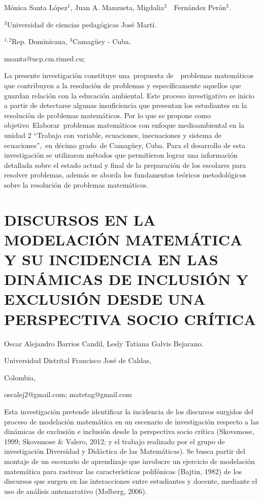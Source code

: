 \begin{datos}

Mónica Santa López$^{1}$, Juan A. Manzueta, Migdalia$^{2}$  Fernández
Perón$^{3}$.

$^{3}$Universidad de ciencias pedagógicas José Martí. 

$^{1,2}$Rep. Dominicana, $^{3}$Camagüey - Cuba.

msanta@ucp.cm.rimed.cu;   

\end{datos}

La presente investigación constituye una propuesta de  problemas matemáticos
que contribuyen a la resolución de problemas y específicamente aquellos
que guardan relación con la educación ambiental. Este proceso investigativo
se inicio a partir de detectarse algunas insuficiencia que presentan
los estudiantes en la resolución de problemas matemáticos. Por lo
que se propone como objetivo Elaborar problemas matemáticos con enfoque
medioambiental en la unidad 2 “Trabajo con variable, ecuaciones, inecuaciones
y sistema de ecuaciones”, en décimo grado de Camagüey, Cuba. Para
el desarrollo de esta investigación se utilizaron métodos que permitieron
lograr una información detallada sobre el estado actual y final de
la preparación de los escolares para resolver problemas, además se
aborda los fundamentos teóricos metodológicos sobre la resolución
de problemas matemáticos. 


\section{DISCURSOS EN LA MODELACIÓN MATEMÁTICA Y SU INCIDENCIA EN LAS DINÁMICAS
DE INCLUSIÓN Y EXCLUSIÓN DESDE UNA PERSPECTIVA SOCIO CRÍTICA}

\begin{datos}

Oscar Alejandro Barrios Candil, Lesly Tatiana Galvis Bejarano.

Universidad Distrital Francisco José de Caldas,

Colombia,

oscalej2@gmail.com; matetag@gmail.com 

\end{datos}

Esta investigación pretende identificar la incidencia de los discursos
surgidos del proceso de modelación matemática en un escenario de investigación
respecto a las dinámicas de exclusión e inclusión desde la perspectiva
socio crítica (Skovsmose, 1999; Skovsmose \& Valero, 2012; y el trabajo
realizado por el grupo de investigación Diversidad y Didáctica de
las Matemáticas). Se busca partir del montaje de un escenario de aprendizaje
que involucre un ejercicio de modelación matemática para rastrear
las características polifónicas (Bajtin, 1982) de los discursos que
surgen en las interacciones entre estudiantes y docente, mediante
el uso de análisis antenarrativo (Mølberg, 2006). 



